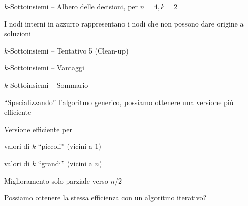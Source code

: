 \begin{frame}{$k$-Sottoinsiemi -- Albero delle decisioni, per $n=4, k=2$}

\BIL
\item I nodi interni in azzurro rappresentano i nodi che non possono dare origine a soluzioni
\EIL


\begin{center}
\scalebox{1.0}{

}
\end{center}

\end{frame}

\begin{frame}{$k$-Sottoinsiemi -- Tentativo 5 (Clean-up)}
	
\vspace{-9pt}	
\begin{Procedure}
\caption[A]{(\INTEGER $n$, \INTEGER $\Missing$, $\INTEGER[\,]\ S$, \INTEGER $i$)}
\end{Procedure}

\end{frame}



\begin{frame}{$k$-Sottoinsiemi -- Vantaggi}


\end{frame}

\begin{frame}{$k$-Sottoinsiemi -- Sommario}

\BIL
\item  “Specializzando” l'algoritmo generico, possiamo ottenere una versione più efficiente
\item  Versione efficiente per 
\BI
	\item valori di $k$ “piccoli” (vicini a $1$)
	\item valori di $k$ “grandi” (vicini a $n$)
\EI
\item Miglioramento solo parziale verso $n/2$
\item Possiamo ottenere la stessa efficienza con un algoritmo iterativo?
\EIL
	
\end{frame}

